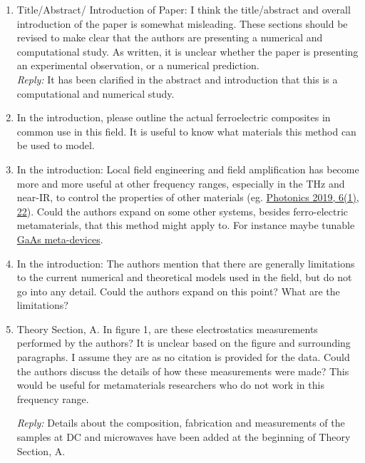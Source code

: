 \documentclass[%
 aip,
 amsmath,amssymb,
 reprint,%
]{revtex4-1}
\newcommand{\rep}[1]{\textcolor{reply}{\textit{Reply:} #1}}
\begin{document}
\begin{enumerate}
\item Title/Abstract/ Introduction of Paper: I think the title/abstract and overall introduction of the
 paper is somewhat misleading. These sections should be revised to make clear that the authors are
  presenting a numerical and computational study. As written, it is unclear whether the paper is presenting
   an experimental observation, or a numerical prediction.\\


\rep{It has been clarified in the abstract and introduction that this is a computational and numerical study.}



\item In the introduction, please outline the actual ferroelectric composites in common use in this field.
 It is useful to know what materials this method can be used to model.

\item In the introduction: Local field engineering and field amplification has become more and more useful
 at other frequency ranges, especially in the THz and near-IR, to control the properties of other materials
  (eg. \href{https://doi.org/10.3390/photonics6010022}{Photonics 2019, 6(1), 22}). Could the authors expand
   on some other systems, besides ferro-electric metamaterials, that this method might apply to. For
    instance maybe tunable
    \href{https://journals.aps.org/prl/abstract/10.1103/PhysRevLett.110.217404}{GaAs meta-devices}.


\item In the introduction: The authors mention that there are generally limitations to the current
 numerical and theoretical models used in the field, but do not go into any detail. Could the authors
  expand on this point? What are the limitations?

\item Theory Section, A. In figure 1, are these electrostatics measurements performed by the authors? It is
 unclear based on the figure and surrounding paragraphs. I assume they are as no citation is provided for
  the data. Could the authors discuss the details of how these measurements were made? This would be useful
   for metamaterials researchers who do not work in this frequency range.

\rep{Details about the composition, fabrication and measurements of the samples at DC and microwaves have been added at the beginning of Theory Section, A.}



\end{enumerate}
\end{document}
